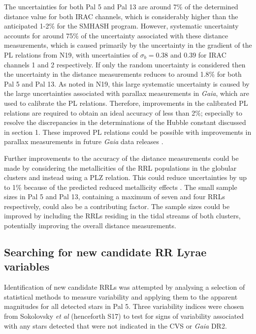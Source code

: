 \documentclass[11pt]{iopart}
\begin{document}
The uncertainties for both Pal 5 and Pal 13 are around 7\% of the determined distance value for both IRAC channels, which is considerably higher than the anticipated 1-2\% for the SMHASH program. However, systematic uncertainty accounts for around 75\% of the uncertainty associated with these distance measurements, which is caused primarily by the uncertainty in the gradient of the PL relations from N19, with uncertainties of $\sigma_{b} = 0.38$ and $0.39$ for IRAC channels 1 and 2 respectively. If only the random uncertainty is considered then the uncertainty in the distance measurements reduces to around 1.8\% for both Pal 5 and Pal 13. As noted in N19, this large systematic uncertainty is caused by the large uncertainties associated with parallax measurements in \textit{Gaia}, which are used to calibrate the PL relations. Therefore, improvements in the calibrated PL relations are required to obtain an ideal accuracy of less than 2\%; especially to resolve the discrepancies in the determinations of the Hubble constant discussed in section 1. These improved PL relations could be possible with improvements in parallax measurements in future \textit{Gaia} data releases \cite{neeley2015}.

Further improvements to the accuracy of the distance measurements could be made by considering the metallicities of the RRL populations in the globular clusters and instead using a PLZ relation. This could reduce uncertainties by up to 1\% \cite{neeley2019} because of the predicted reduced metallicity effects \cite{beaton2016}. The small sample sizes in Pal 5 and Pal 13, containing a maximum of seven and four RRLs respectively, could also be a contributing factor. The sample sizes could be improved by including the RRLs residing in the tidal streams of both clusters, potentially improving the overall distance measurements.

\subsection{Searching for new candidate RR Lyrae variables}
Identification of new candidate RRLs was attempted by analysing a selection of statistical methods to measure variability and applying them to the apparent magnitudes for all detected stars in Pal 5. Three variability indices were chosen from Sokolovsky \textit{et al} \cite{sokolovsky2017comparative} (henceforth S17) to test for signs of variability associated with any stars detected that were not indicated in the CVS or \textit{Gaia} DR2.
\end{document}
